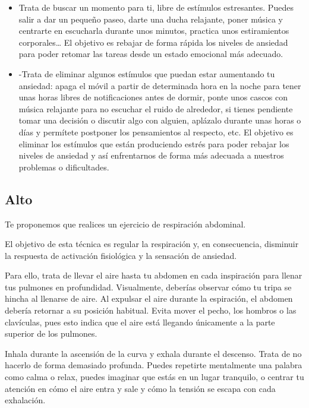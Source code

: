                 \begin{itemize}
                    \item Trata de buscar un momento para ti, libre de estímulos estresantes. Puedes salir a dar un 
                    pequeño paseo, darte una ducha relajante, poner música y centrarte en escucharla durante unos 
                    minutos, practica unos estiramientos corporales… El objetivo es rebajar de forma rápida los 
                    niveles de ansiedad para poder retomar las tareas desde un estado emocional más adecuado. 
                    \item -Trata de eliminar algunos estímulos que puedan estar aumentando tu ansiedad: apaga el 
                    móvil a partir de determinada hora en la noche para tener unas horas libres de notificaciones 
                    antes de dormir, ponte unos cascos con música relajante para no escuchar el ruido de alrededor, 
                    si tienes pendiente tomar una decisión o discutir algo con alguien, aplázalo durante unas horas 
                    o días y permítete postponer los pensamientos al respecto, etc. El objetivo es eliminar los 
                    estímulos que están produciendo estrés para poder rebajar los niveles de ansiedad y así 
                    enfrentarnos de forma más adecuada a nuestros problemas o dificultades. 
                \end{itemize}
        \subsection{Alto}
            Te proponemos que realices un ejercicio de respiración abdominal. 

            El objetivo de esta técnica es regular la respiración y, en consecuencia, disminuir la respuesta de 
            activación fisiológica y la sensación de ansiedad. 
            
            Para ello, trata de llevar el aire hasta tu abdomen en cada inspiración para llenar tus pulmones en 
            profundidad. Visualmente, deberías observar cómo tu tripa se hincha al llenarse de aire. Al expulsar 
            el aire durante la espiración, el abdomen debería retornar a su posición habitual. Evita mover el pecho, 
            los hombros o las clavículas, pues esto indica que el aire está llegando únicamente a la parte superior 
            de los pulmones.
            
            Inhala durante la ascensión de la curva y exhala durante el descenso. Trata de no hacerlo de forma 
            demasiado profunda. Puedes repetirte mentalmente una palabra como calma o relax, puedes imaginar que 
            estás en un lugar tranquilo, o centrar tu atención en cómo el aire entra y sale y cómo la tensión se 
            escapa con cada exhalación. 
    
